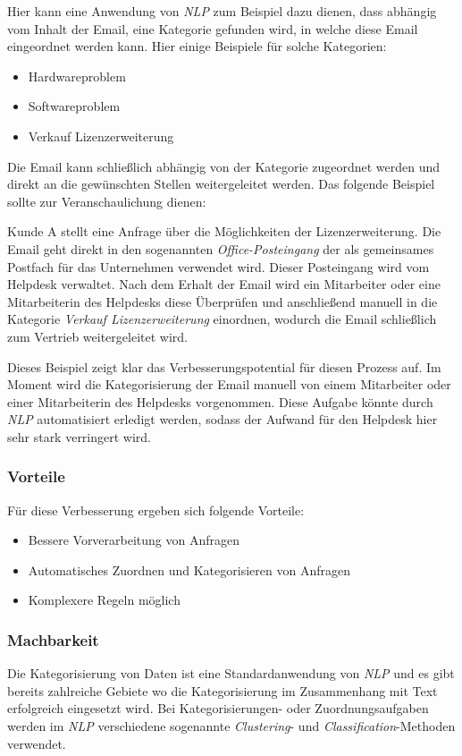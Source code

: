 Hier kann eine Anwendung von \textit{NLP} zum Beispiel dazu dienen, dass abhängig vom Inhalt der Email, eine Kategorie gefunden wird, in welche diese Email eingeordnet werden kann. Hier einige Beispiele für solche Kategorien:

\begin{itemize}
	\item Hardwareproblem
	\item Softwareproblem
	\item Verkauf Lizenzerweiterung
\end{itemize}
Die Email kann schließlich abhängig von der Kategorie zugeordnet werden und direkt an die gewünschten Stellen weitergeleitet werden. Das folgende Beispiel sollte zur Veranschaulichung dienen:

Kunde A stellt eine Anfrage über die Möglichkeiten der Lizenzerweiterung. Die Email geht direkt in den sogenannten \textit{Office-Posteingang} der als gemeinsames Postfach für das Unternehmen verwendet wird. Dieser Posteingang wird vom Helpdesk verwaltet. Nach dem Erhalt der Email wird ein Mitarbeiter oder eine Mitarbeiterin des Helpdesks diese Überprüfen und anschließend manuell in die Kategorie \textit{Verkauf Lizenzerweiterung} einordnen, wodurch die Email schließlich zum Vertrieb weitergeleitet wird.

Dieses Beispiel zeigt klar das Verbesserungspotential für diesen Prozess auf. Im Moment wird die Kategorisierung der Email manuell von einem Mitarbeiter oder einer Mitarbeiterin des Helpdesks vorgenommen. Diese Aufgabe könnte durch \textit{NLP} automatisiert erledigt werden, sodass der Aufwand für den Helpdesk hier sehr stark verringert wird.

\subsubsection{Vorteile}
Für diese Verbesserung ergeben sich folgende Vorteile:

\begin{itemize}
	\item Bessere Vorverarbeitung von Anfragen
	\item Automatisches Zuordnen und Kategorisieren von Anfragen
	\item Komplexere Regeln möglich
\end{itemize}

\subsubsection{Machbarkeit}
Die Kategorisierung von Daten ist eine Standardanwendung von \textit{NLP} und es gibt bereits zahlreiche Gebiete wo die Kategorisierung im Zusammenhang mit Text erfolgreich eingesetzt wird. Bei Kategorisierungen- oder Zuordnungsaufgaben werden im \textit{NLP} verschiedene sogenannte \textit{Clustering}- und \textit{Classification}-Methoden verwendet. 

